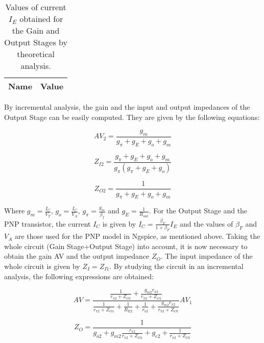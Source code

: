 \begin{table}[H]
  \centering
  \begin{tabular}{|c|c|}
    \hline    
    {\bf Name} & {\bf Value} \\ \hline
    
  \end{tabular}
  \caption{Values of current $I_E$ obtained for the Gain and Output Stages by theoretical analysis.}
  \label{tab:theoretical_IE}
\end{table}

By incremental analysis, the gain and the input and output impedances of the Output Stage can be easily computed. They are given by the following equations:

\begin{equation} \label{eq:gain_OutputStage}
  AV_2=\frac{g_m}{g_{\pi}+g_E+g_o+g_m}
\end{equation}

\begin{equation} \label{eq:input_impedance_OutputStage}
  Z_{I2}=\frac{g_{\pi}+g_E+g_o+g_m}{g_{\pi}(g_{\pi}+g_E+g_o)}
\end{equation}

\begin{equation} \label{eq:output_impedance_OutputStage}
  Z_{O2}=\frac{1}{g_{\pi}+g_E+g_o+g_m}
\end{equation}

Where $g_m=\frac{I_C}{V_T}$, $g_o=\frac{I_C}{V_A}$, $g_{\pi}=\frac{g_m}{\beta_f}$ and $g_E=\frac{1}{R_{out}}$. For the Output Stage and the PNP transistor, the current $I_C$ is given by $I_C=\frac{\beta_F}{1+\beta_F}I_E$ and the values of $\beta_F$ and $V_A$ are those used for the PNP model in Ngspice, as mentioned above. Taking the whole circuit (Gain Stage+Output Stage) into account, it is now necessary to obtain the gain AV and the output impedance $Z_O$. The input impedance of the whole circuit is given by $Z_I=Z_{I1}$. By studying the circuit in an incremental analysis, the following expressions are obtained:

\begin{equation} \label{eq:gain}
  AV=\frac{\frac{1}{r_{\pi2}+Z_{O1}}+\frac{g_{m2}r_{\pi2}}{r_{\pi2}+Z_{O1}}}{\frac{1}{r_{\pi2}+Z_{O1}}+\frac{1}{R_{E2}}+\frac{1}{r_{o2}}+\frac{g_{m2}r_{\pi2}}{r_{\pi2}+Z_{O1}}}AV_1
\end{equation}

\begin{equation} \label{eq:input_impedance_OutputStage}
  Z_O=\frac{1}{g_{o2}+g_{m2}\frac{r_{\pi2}}{r_{\pi2}+Z_{O1}}+g_{e2}+\frac{1}{r_{\pi2}+Z_{O1}}}
\end{equation}

